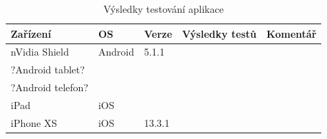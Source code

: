 \begin{table}[H]
	\begin{tabularx}{\textwidth}{|X|X|X|X|X|}
		\hline
		Zařízení        & OS      & Verze  & Výsledky testů & Komentář \\ \hline
		nVidia Shield   & Android & 5.1.1  &                &          \\ \hline
		?Android tablet?  &         &        &                &          \\ \hline
		?Android telefon? &         &        &                &          \\ \hline
		iPad            & iOS     &        &                &          \\ \hline
		iPhone XS       & iOS     & 13.3.1 &                &          \\ \hline
	\end{tabularx}
	\caption{Výsledky testování aplikace}
\end{table}